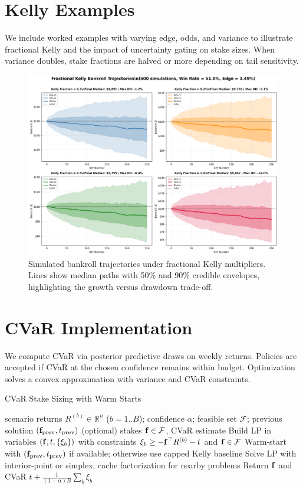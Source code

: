 \section{Kelly Examples}
We include worked examples with varying edge, odds, and variance to illustrate fractional Kelly and the impact of uncertainty gating on stake sizes. When variance doubles, stake fractions are halved or more depending on tail sensitivity.

\begin{figure}[t]
  \centering
  \includegraphics[width=0.9\linewidth]{../figures/bankroll_trajectories.png}
  \caption[Fractional Kelly bankroll trajectories]{Simulated bankroll trajectories under fractional Kelly multipliers. Lines show median paths with 50\% and 90\% credible envelopes, highlighting the growth versus drawdown trade-off.}
  \label{fig:bankroll-trajectories}
\end{figure}

\section{CVaR Implementation}
We compute CVaR via posterior predictive draws on weekly returns. Policies are accepted if CVaR at the chosen confidence remains within budget. Optimization solves a convex approximation with variance and CVaR constraints.

\begin{algorithm}[t]
  \caption{CVaR Stake Sizing with Warm Starts}
  \label{alg:cvar-solve}
  \begin{algorithmic}[1]
    \Require scenario returns $R^{(b)}\in\mathbb{R}^n$ ($b=1..B$); confidence $\alpha$; feasible set $\mathcal F$; previous solution $(\mathbf{f}_{\text{prev}},t_{\text{prev}})$ (optional)
    \Ensure stakes $\mathbf{f}\in\mathcal F$, CVaR estimate
    \State Build LP in variables $(\mathbf{f},t,\{\xi_b\})$ with constraints $\xi_b\ge-\mathbf{f}^\top R^{(b)}-t$ and $\mathbf{f}\in\mathcal F$
    \State Warm‑start with $(\mathbf{f}_{\text{prev}},t_{\text{prev}})$ if available; otherwise use capped Kelly baseline
    \State Solve LP with interior‑point or simplex; cache factorization for nearby problems
    \State Return $\mathbf{f}$ and CVaR $t+\frac{1}{(1-\alpha)B}\sum_b \xi_b$
  \end{algorithmic}
\end{algorithm}

